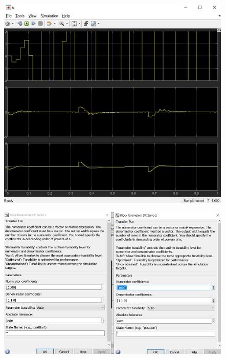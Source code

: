 \begin{figure}[H]
	\centering
	\includegraphics{8.jpg}
	\label{fig:label4}
\end{figure}

\begin{figure}[H]
	\centering
	\includegraphics{9.jpg}
	\label{fig:label4}
\end{figure}

